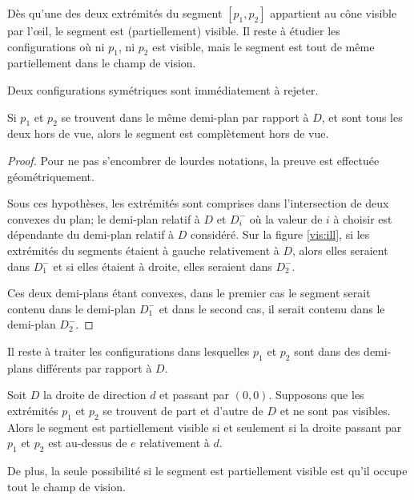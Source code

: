 Dès qu'une des deux extrémités du segment $[p_1, p_2]$ appartient au
cône visible par l'\oe{}il, le segment est (partiellement)
visible. Il reste à étudier les configurations où ni $p_1$, ni $p_2$ est
visible, mais le segment est tout de même partiellement dans le champ de vision.

Deux configurations symétriques sont immédiatement à rejeter.
\begin{obs}\label{obs:side}
  Si $p_1$ et $p_2$ se trouvent dans le même demi-plan par rapport à $D$,
  et sont tous les deux hors de vue, alors le segment est complètement hors de vue.
\end{obs}
\begin{proof}
  Pour ne pas s'encombrer de lourdes notations, la preuve est effectuée
  géométriquement.

  Sous ces hypothèses, les extrémités sont comprises dans l'intersection
  de deux convexes du plan; le demi-plan relatif à $D$ et $D_i^-$ où la valeur
  de $i$ à choisir est dépendante du demi-plan relatif à $D$ considéré.
  Sur la figure \ref{vis:ill}, si les extrémités du segments étaient
  à gauche relativement à $D$, alors elles seraient dans $D_1^-$ et
  si elles étaient à droite, elles seraient dans $D_2^-$.

  Ces deux demi-plans étant convexes, dans le premier cas le
  segment serait contenu dans le demi-plan $D_1^-$ et dans le second
  cas, il serait contenu dans le demi-plan $D_2^-$.
\end{proof}

Il reste à traiter les configurations dans lesquelles $p_1$
et $p_2$ sont dans des demi-plans différents par rapport à $D$.

\begin{obs}\label{obs:couvr}
  Soit $D$ la droite de direction $d$ et passant par $(0, 0)$.
  Supposons que les extrémités $p_1$ et $p_2$ se trouvent
  de part et d'autre de $D$ et ne sont pas visibles.
  Alors le segment est partiellement visible
  si et seulement si la droite passant par $p_1$
  et $p_2$ est \og au-dessus\fg{} de $e$ relativement à $d$.

  De plus, la seule possibilité si le segment est partiellement
  visible est qu'il occupe tout le champ de vision.
\end{obs}

